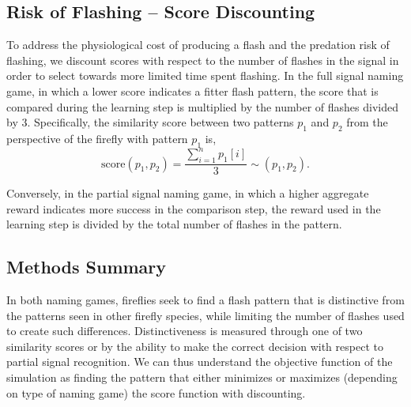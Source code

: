 \subsection{Risk of Flashing -- Score Discounting}
To address the physiological cost of producing a flash and the predation risk of flashing, we discount scores with respect to the number of flashes in the signal in order to select towards more limited time spent flashing. 
In the full signal naming game, in which a lower score indicates a fitter flash pattern, the score that is compared during the learning step is multiplied by the number of flashes divided by 3. Specifically, the similarity score between two patterns $p_1$ and $p_2$ from the perspective of the firefly with pattern $p_1$ is, \[ \textrm{score}(p_1, p_2) = \frac{\sum_{i = 1}^{n} p_1[i]}{3} \sim(p_1, p_2).\]

Conversely, in the partial signal naming game, in which a higher aggregate reward indicates more success in the comparison step, the reward used in the learning step is divided by the total number of flashes in the pattern. 



\subsection{Methods Summary}
In both naming games, fireflies seek to find a flash pattern that is distinctive from the patterns seen in other firefly species, while limiting the number of flashes used to create such differences.
Distinctiveness is measured through one of two similarity scores or by the ability to make the correct decision with respect to partial signal recognition.
We can thus understand the objective function of the simulation as finding the pattern that either minimizes or maximizes (depending on type of naming game) the score function with discounting. 
